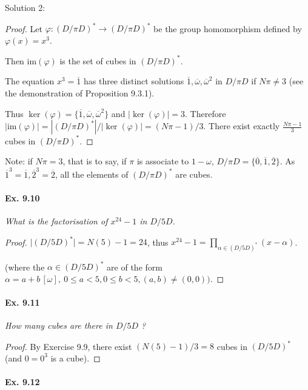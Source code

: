 \documentclass[11pt,a4paper]{article}
\begin{document}
Solution 2:
\begin{proof}
Let $\varphi : (D/\pi D)^* \to (D/\pi D)^*$ be the group homomorphism defined by $\varphi(x) = x^3$.

Then $\mathrm{im}(\varphi)$ is the set of cubes in $(D/\pi D)^*$.

The equation $x^3 = \overline{1}$ has three distinct solutions $\overline{1}, \overline{\omega}, \overline{\omega}^2$  in $D/ \pi D$ if $N\pi \ne 3$ (see the demonstration of Proposition 9.3.1).

Thus $\ker(\varphi)= \{\overline{1}, \overline{\omega}, \overline{\omega}^2\}$ and $| \ker(\varphi)| = 3$. Therefore $| \mathrm{im} (\varphi) | = | (D/\pi D)^* | / |\ker(\varphi) | = (N\pi - 1)/3$. There exist exactly $\frac{N\pi-1}{3}$ cubes in $(D/\pi D)^*$.
\end{proof}

Note: if $N\pi = 3$, that is to say, if $\pi$ is associate to $1-\omega$, $D/\pi D = \{\overline{0},\overline{1}, \overline{2}\}$. As $\overline{1}^3 = \overline{1}, \overline{2}^3 = \overline{2}$, all the elements of $(D/\pi D)^*$ are cubes.

\paragraph{Ex. 9.10}

{\it What is the factorisation of $x^{24}-1$ in $D/5D$.
}

\begin{proof}
$\vert (D/5D)^*\vert = N(5) - 1 = 24$, thus $x^{24} - 1 = \prod\limits_{\alpha \in (D/ 5 D)^*} (x - \alpha)$.

(where the $\alpha \in (D/ 5 D)^*$ are of the form $\alpha = a + b\, [\omega],\  0 \leq a <5, 0 \leq b <5, (a,b) \ne (0,0))$.
\end{proof}

\paragraph{Ex. 9.11}

{\it How many cubes are there in $D/5D$ ?
}

\begin{proof}
By Exercise 9.9, there exist $(N(5) - 1)/3 = 8$ cubes in $(D/5D)^*$ (and $0 = 0^3$ is a cube).
\end{proof}

\paragraph{Ex. 9.12}
\end{document}
